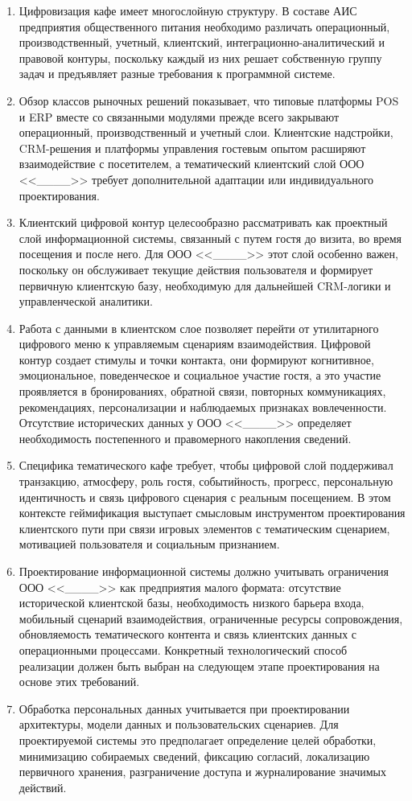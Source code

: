 \begin{enumerate}
    \item Цифровизация кафе имеет многослойную структуру. В составе АИС предприятия общественного питания необходимо различать операционный, производственный, учетный, клиентский, интеграционно-аналитический и правовой контуры, поскольку каждый из них решает собственную группу задач и предъявляет разные требования к программной системе.
    \item Обзор классов рыночных решений показывает, что типовые платформы POS и ERP вместе со связанными модулями прежде всего закрывают операционный, производственный и учетный слои. Клиентские надстройки, CRM-решения и платформы управления гостевым опытом расширяют взаимодействие с посетителем, а тематический клиентский слой ООО <<\_\_\_\_>> требует дополнительной адаптации или индивидуального проектирования.
    \item Клиентский цифровой контур целесообразно рассматривать как проектный слой информационной системы, связанный с путем гостя до визита, во время посещения и после него. Для ООО <<\_\_\_\_>> этот слой особенно важен, поскольку он обслуживает текущие действия пользователя и формирует первичную клиентскую базу, необходимую для дальнейшей CRM-логики и управленческой аналитики.
    \item Работа с данными в клиентском слое позволяет перейти от утилитарного цифрового меню к управляемым сценариям взаимодействия. Цифровой контур создает стимулы и точки контакта, они формируют когнитивное, эмоциональное, поведенческое и социальное участие гостя, а это участие проявляется в бронированиях, обратной связи, повторных коммуникациях, рекомендациях, персонализации и наблюдаемых признаках вовлеченности. Отсутствие исторических данных у ООО <<\_\_\_\_>> определяет необходимость постепенного и правомерного накопления сведений.
    \item Специфика тематического кафе требует, чтобы цифровой слой поддерживал транзакцию, атмосферу, роль гостя, событийность, прогресс, персональную идентичность и связь цифрового сценария с реальным посещением. В этом контексте геймификация выступает смысловым инструментом проектирования клиентского пути при связи игровых элементов с тематическим сценарием, мотивацией пользователя и социальным признанием.
    \item Проектирование информационной системы должно учитывать ограничения ООО <<\_\_\_\_>> как предприятия малого формата: отсутствие исторической клиентской базы, необходимость низкого барьера входа, мобильный сценарий взаимодействия, ограниченные ресурсы сопровождения, обновляемость тематического контента и связь клиентских данных с операционными процессами. Конкретный технологический способ реализации должен быть выбран на следующем этапе проектирования на основе этих требований.
    \item Обработка персональных данных учитывается при проектировании архитектуры, модели данных и пользовательских сценариев. Для проектируемой системы это предполагает определение целей обработки, минимизацию собираемых сведений, фиксацию согласий, локализацию первичного хранения, разграничение доступа и журналирование значимых действий.
\end{enumerate}

